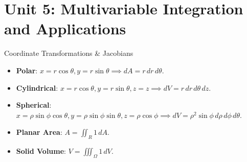 \chapter{Unit 5: Multivariable Integration and Applications}

\begin{formulabox}{Coordinate Transformations \& Jacobians}
\begin{itemize}[leftmargin=1.5em]
    \item \textbf{Polar}: $x = r\cos\theta, y = r\sin\theta \implies dA = r\,dr\,d\theta$.
    \item \textbf{Cylindrical}: $x = r\cos\theta, y = r\sin\theta, z = z \implies dV = r\,dr\,d\theta\,dz$.
    \item \textbf{Spherical}: $x = \rho\sin\phi\cos\theta, y = \rho\sin\phi\sin\theta, z = \rho\cos\phi \implies dV = \rho^2 \sin\phi\,d\rho\,d\phi\,d\theta$.
    \item \textbf{Planar Area}: $A = \iint_R 1\,dA$.
    \item \textbf{Solid Volume}: $V = \iiint_\Omega 1\,dV$.
\end{itemize}
\end{formulabox}
